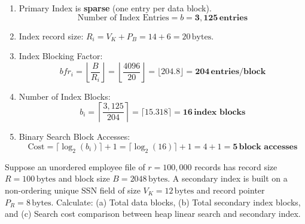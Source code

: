 \documentclass[11pt,a4paper]{article}
\newenvironment{Problem}[1][Problem Scenario]{\begin{tcolorbox}[problembox, title=#1]}{\end{tcolorbox}}
\newenvironment{Solution}[1][Step-by-Step Solution]{\begin{tcolorbox}[solbox, title=#1]}{\end{tcolorbox}}
\begin{document}
\begin{Solution}
\begin{enumerate}
  \item Primary Index is \textbf{sparse} (one entry per data block).
    \begin{equation*}
      \text{Number of Index Entries} = b = \mathbf{3,125\,\text{entries}}
    \end{equation*}
  \item Index record size: $R_i = V_K + P_B = 14 + 6 = 20\,\text{bytes}$.
  \item Index Blocking Factor:
    \begin{equation*}
      bfr_i = \left\lfloor \frac{B}{R_i} \right\rfloor = \left\lfloor \frac{4096}{20} \right\rfloor = \lfloor 204.8 \rfloor = \mathbf{204\,\text{entries/block}}
    \end{equation*}
  \item Number of Index Blocks:
    \begin{equation*}
      b_i = \left\lceil \frac{3,125}{204} \right\rceil = \lceil 15.318 \rceil = \mathbf{16\,\text{index blocks}}
    \end{equation*}
  \item Binary Search Block Accesses:
    \begin{equation*}
      \text{Cost} = \lceil \log_2(b_i) \rceil + 1 = \lceil \log_2(16) \rceil + 1 = 4 + 1 = \mathbf{5\,\text{block accesses}}
    \end{equation*}
\end{enumerate}
\end{Solution}

\begin{Problem}[Problem 3: Secondary Index on a Non-Ordering Key Field]
Suppose an unordered employee file of $r = 100,000$ records has record size $R = 100\,\text{bytes}$ and block size $B = 2048\,\text{bytes}$. A secondary index is built on a non-ordering unique SSN field of size $V_K = 12\,\text{bytes}$ and record pointer $P_R = 8\,\text{bytes}$. Calculate: (a) Total data blocks, (b) Total secondary index blocks, and (c) Search cost comparison between heap linear search and secondary index.
\end{Problem}
\end{document}
